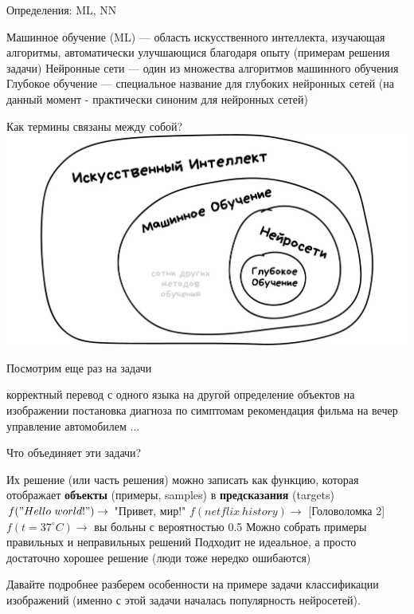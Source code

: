 \documentclass[aspectratio=169, professionalfonts]{beamer}
\begin{document}
\begin{frame}{Определения: ML, NN}
    \begin{outline}
        \1 Машинное обучение (ML) --- область искусственного интеллекта, изучающая алгоритмы,
        автоматически улучшающися благодаря опыту (примерам решения задачи)
        \1 Нейронные сети --- один из множества алгоритмов машинного обучения
        \1 Глубокое обучение --- специальное название для глубоких нейронных сетей (на данный момент - практически синоним для нейронных сетей)
    \end{outline}
\end{frame}

\begin{frame}{Как термины связаны между собой?}
    \centering
    \includegraphics[width=.9\linewidth]{figures/fig6-terms.jpg}
\end{frame}

\begin{frame}{Посмотрим еще раз на задачи}
    \begin{outline}
        \1 корректный перевод с одного языка на другой
        \1 определение объектов на изображении
        \1 постановка диагноза по симптомам
        \1 рекомендация фильма на вечер
        \1 управление автомобилем
        \1 ...
    \end{outline}
\end{frame}

\begin{frame}{Что объединяет эти задачи?}
    \begin{outline}
        \1 Их решение (или часть решения) можно записать как функцию, которая отображает
        \textbf{объекты} (примеры, samples) в \textbf{предсказания} (targets)
            \2 \( f("Hello \ world!") \to \) "Привет, мир!"
            \2 \( f(netflix \ history) \to \) [Головоломка 2]
            \2 \( f(t = 37^\circ C) \to \) вы больны с вероятностью 0.5
        \pause
        \1 Можно собрать примеры правильных и неправильных решений
        \pause
        \1 Подходит не идеальное, а просто достаточно хорошее решение
            (люди тоже нередко ошибаются)
    \end{outline}

    Давайте подробнее разберем особенности на примере задачи классификации изображений (именно с этой задачи началась популярность нейросетей).
\end{frame}
\end{document}
